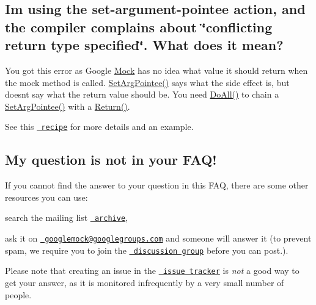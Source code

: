 \subsection*{I\textquotesingle{}m using the set-\/argument-\/pointee action, and the compiler complains about \char`\"{}conflicting return type specified\char`\"{}. What does it mean?}

You got this error as Google \mbox{\hyperlink{class_mock}{Mock}} has no idea what value it should return when the mock method is called. {\ttfamily \mbox{\hyperlink{namespacetesting_a6dbe77dc170c495ea300dd9d74ed4595}{Set\+Arg\+Pointee()}}} says what the side effect is, but doesn\textquotesingle{}t say what the return value should be. You need {\ttfamily \mbox{\hyperlink{namespacetesting_a3824c79dc6e9e05c337a675e82da2045}{Do\+All()}}} to chain a {\ttfamily \mbox{\hyperlink{namespacetesting_a6dbe77dc170c495ea300dd9d74ed4595}{Set\+Arg\+Pointee()}}} with a {\ttfamily \mbox{\hyperlink{namespacetesting_adae3994eb444d1ad2dd602454b854663}{Return()}}}.

See this \href{CookBook.md\#mocking-side-effects}{\texttt{ recipe}} for more details and an example.

\subsection*{My question is not in your F\+A\+Q!}

If you cannot find the answer to your question in this F\+AQ, there are some other resources you can use\+:


\begin{DoxyEnumerate}
\item search the mailing list \href{http://groups.google.com/group/googlemock/topics}{\texttt{ archive}},
\end{DoxyEnumerate}
\begin{DoxyEnumerate}
\item ask it on \href{mailto:googlemock@googlegroups.com}{\texttt{ googlemock@googlegroups.\+com}} and someone will answer it (to prevent spam, we require you to join the \href{http://groups.google.com/group/googlemock}{\texttt{ discussion group}} before you can post.).
\end{DoxyEnumerate}

Please note that creating an issue in the \href{https://github.com/google/googletest/issues}{\texttt{ issue tracker}} is {\itshape not} a good way to get your answer, as it is monitored infrequently by a very small number of people.

